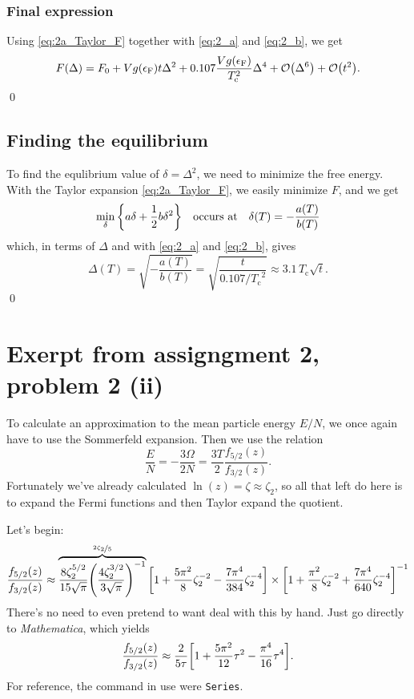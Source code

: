 \documentclass[11pt,letter, swedish, english
]{article}
\newcommand{\Tc}{\ensuremath{T_{\text{c}}}}
\newcommand{\eF}{\ensuremath{\epsilon_{\text{F}}}}
\begin{document}
\subsubsection{Final expression}
Using \eqref{eq:2a_Taylor_F} together with \eqref{eq:2_a} and
\eqref{eq:2_b}, we get
\begin{equation}\label{eq:2a_Taylor_F_final}
F(\Delta)=F_0+Vg(\eF)t\Delta^2 
+ 0.107\frac{Vg(\eF)}{\Tc^2}\Delta^4 + \order{\Delta^6}+\order{t^2}.
\end{equation}
\qed


\subsection{Finding the equilibrium}
To find the equlibrium value of $\delta=\Delta^2$, we need to minimize
the free energy. With the Taylor expansion \eqref{eq:2a_Taylor_F}, we
easily minimize $F$, and we get
\begin{equation}
\min_{\delta}\qty{a\delta+\frac{1}{2}b\delta^2}\quad\text{occurs at}\quad
\delta(T)=-\frac{a(T)}{b(T)}
\end{equation}
which, in terms of $\Delta$ and with \eqref{eq:2_a} and
\eqref{eq:2_b}, gives
\begin{equation}
\Delta(T)=\sqrt{-\frac{a(T)}{b(T)}}
=\sqrt{\frac{t}{0.107/\Tc^2}}
\approx 3.1\,\Tc\sqrt{t}.
\end{equation}
\qed



\newpage
\appendix
\setcounter{equation}{0}
\renewcommand{\theequation}{A\arabic{equation}}

\section{Exerpt from assigngment 2, problem 2 (ii)}
\label{sec:ass_2_Cv}
To calculate an approximation to the mean particle energy $E/N$, we
once again have to use the Sommerfeld expansion. Then we use the relation
\begin{equation}
\frac{E}{N}=-\frac{3\Omega}{2N}=\frac{3T}{2}\frac{f_{5/2}(z)}{f_{3/2}(z)}.
\end{equation}
Fortunately we've already calculated $\ln(z)=\zeta\approx\zeta_2$, so all
that left do here is to expand the Fermi functions and then
Taylor expand the quotient.

Let's begin:
\begin{equation}
\frac{f_{5/2}(z)}{f_{3/2}(z)}\approx
\overbrace{\frac{8\zeta_2^{5/2}}{15\sqrt{\pi}}
\qty(\frac{4\zeta_2^{3/2}}{3\sqrt{\pi}})^{-1}}^{\nicefrac{2\zeta_2}{5}}
\qty[1+\frac{5\pi^2}{8}\zeta_2^{-2}
-\frac{7\pi^4}{384}\zeta_2^{-4} ]
\times \qty[1+\frac{\pi^2}{8}\zeta_2^{-2} 
+\frac{7\pi^4}{640}\zeta_2^{-4} ]^{-1}
\end{equation}
There's no need to even pretend to want deal with this by hand.
Just go directly to \emph{Mathematica}, which yields
\begin{equation}
\frac{f_{5/2}(z)}{f_{3/2}(z)}\approx \frac{2}{5\tau}
\qty[1+\frac{5\pi^2}{12}\tau^2-\frac{\pi^4}{16}\tau^4].
\end{equation}
For reference, the command in use were \texttt{Series}.
\end{document}
